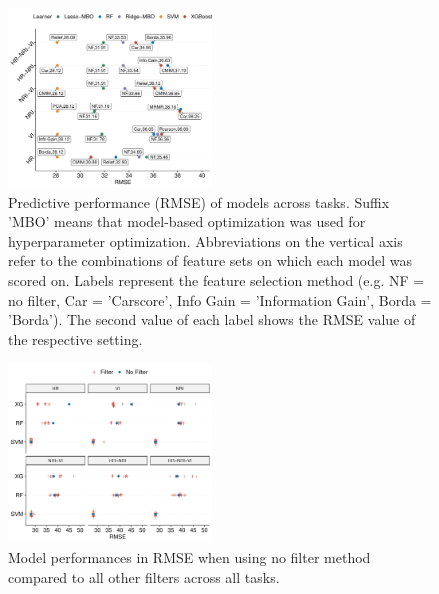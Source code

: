 \documentclass[journal]{IEEEtran}
\begin{document}
\begin{figure} [t!]
	\centering
	\begin{center}
		\includegraphics[width=0.48\textwidth] {performance-results-1.pdf}
		\caption{Predictive performance (RMSE) of models across tasks. Suffix 'MBO' means that model-based optimization was used for hyperparameter optimization. Abbreviations on the vertical axis refer to the combinations of feature sets on which each model was scored on. Labels represent the feature selection method (e.g. NF = no filter, Car = 'Carscore', Info Gain = 'Information Gain', Borda = 'Borda'). The second value of each label shows the RMSE value of the respective setting.}\label{fig:perf-result}
	\end{center}
\end{figure}

\begin{figure} [t!]
	\centering
	\begin{center}
		\includegraphics[width=0.48\textwidth] {filter-effect-all-vs-no-filter-1.pdf}
		\caption{Model performances in RMSE when using no filter method compared to all other filters across all tasks.}\label{fig:filter-effects-no-filter}
	\end{center}
\end{figure}
\end{document}
